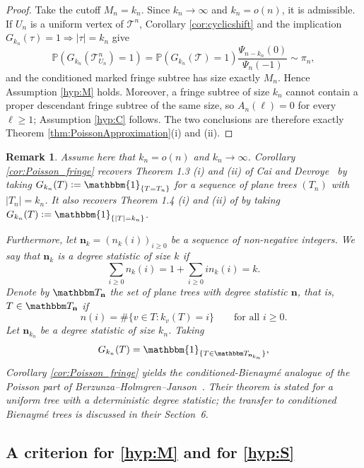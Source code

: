 \documentclass[a4paper,11pt]{article}
\newtheorem{remark}[theorem]{Remark}
\DeclareRobustCommand{\P}{\mathbb{P}}
\DeclareRobustCommand{\1}{\mathbf{1}}
\begin{document}
\begin{proof}
Take the cutoff $M_n=k_n$. Since $k_n\to\infty$ and $k_n=o(n)$, it is admissible. If $U_n$ is a uniform vertex of $\mathcal T^n$, Corollary \ref{cor:cyclicshift} and the implication $G_{k_n}(\tau)=1\Rightarrow |\tau|=k_n$ give
\[
\P(G_{k_n}(\mathcal T^n_{U_n})=1)
=
\P(G_{k_n}(\mathcal T)=1)\frac{\Psi_{n-k_n}(0)}{\Psi_n(-1)}
\sim \pi_n,
\]
and the conditioned marked fringe subtree has size exactly $M_n$. Hence Assumption \ref{hyp:M} holds. Moreover, a fringe subtree of size $k_n$ cannot contain a proper descendant fringe subtree of the same size, so $A_n(\ell)=0$ for every $\ell\ge1$; Assumption \ref{hyp:C} follows. The two conclusions are therefore exactly Theorem \ref{thm:PoissonApproximation}\textup{(i)} and \textup{(ii)}.
\end{proof}

\begin{remark}\label{rem:implication_fringe}
Assume here that $k_n=o(n)$ and $k_n\to\infty$.
Corollary \ref{cor:Poisson_fringe} recovers Theorem 1.3 \textup{(i)} and
\textup{(ii)} of Cai and Devroye~\cite{CD17} by taking
$G_{k_n}(T):=\mathbbm{1}_{\{T=T_n\}}$ for a sequence of plane trees
$(T_n)$ with $|T_n|=k_n$. It also recovers Theorem 1.4 \textup{(i)} and
\textup{(ii)} of \cite{CD17} by taking
$G_{k_n}(T):=\mathbbm{1}_{\{|T|=k_n\}}$.

Furthermore, let $\mathbf n_k=(n_k(i))_{i\ge0}$ be a sequence of
non-negative integers. We say that $\mathbf n_k$ is a degree statistic of
size $k$ if
$$
\sum_{i\ge0} n_k(i)
=
1+\sum_{i\ge0} i n_k(i)
=
k.
$$
Denote by $\mathbbm T_{\mathbf n}$ the set of plane trees with degree
statistic $\mathbf n$, that is, $T\in\mathbbm T_{\mathbf n}$ if
$$
n(i)=\#\{v\in T:k_v(T)=i\}
\qquad\textrm{for all } i\ge0.
$$
Let $\mathbf n_{k_n}$ be a degree statistic of size $k_n$. Taking
$$
  G_{k_n}(T)
  =\mathbbm{1}_{\{T\in\mathbbm T_{\mathbf n_{k_n}}\}},
$$
Corollary \ref{cor:Poisson_fringe} yields the conditioned-Bienaym\'e
analogue of the Poisson part of
Berzunza--Holmgren--Janson~\cite[Theorem~4.2]{BHJ26}. Their theorem is
stated for a uniform tree with a deterministic degree statistic; the
transfer to conditioned Bienaym\'e trees is discussed in their Section~6.
\end{remark}




 \subsection{A criterion for \ref{hyp:M} and for \ref{hyp:S}}
 
\end{document}
